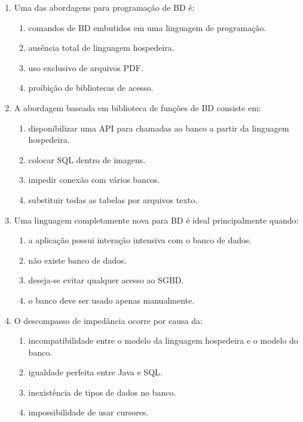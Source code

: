 \documentclass[12pt,a4paper]{article}
\begin{document}
\begin{enumerate}[label=\textbf{Q\arabic*.}]
\item Uma das abordagens para programação de BD é:

\begin{enumerate}[label=\alph*)]
    \item comandos de BD embutidos em uma linguagem de programação.
    \item ausência total de linguagem hospedeira.
    \item uso exclusivo de arquivos PDF.
    \item proibição de bibliotecas de acesso.
\end{enumerate}

\item A abordagem baseada em biblioteca de funções de BD consiste em:

\begin{enumerate}[label=\alph*)]
    \item disponibilizar uma API para chamadas ao banco a partir da linguagem hospedeira.
    \item colocar SQL dentro de imagens.
    \item impedir conexão com vários bancos.
    \item substituir todas as tabelas por arquivos texto.
\end{enumerate}

\item Uma linguagem completamente nova para BD é ideal principalmente quando:

\begin{enumerate}[label=\alph*)]
    \item a aplicação possui interação intensiva com o banco de dados.
    \item não existe banco de dados.
    \item deseja-se evitar qualquer acesso ao SGBD.
    \item o banco deve ser usado apenas manualmente.
\end{enumerate}

\item O descompasso de impedância ocorre por causa da:

\begin{enumerate}[label=\alph*)]
    \item incompatibilidade entre o modelo da linguagem hospedeira e o modelo do banco.
    \item igualdade perfeita entre Java e SQL.
    \item inexistência de tipos de dados no banco.
    \item impossibilidade de usar cursores.
\end{enumerate}


\end{enumerate}
\end{document}
